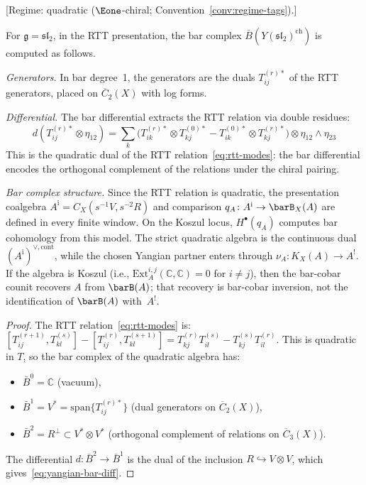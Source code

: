 \begin{theorem}\label{thm:yangian-bar-rtt}
\textup{[Regime: quadratic \textup{(}$\Eone$-chiral;
Convention~\textup{\ref{conv:regime-tags})}.]}

For $\mathfrak{g} = \mathfrak{sl}_2$, in the RTT presentation, the bar complex $\bar{B}(Y(\mathfrak{sl}_2)^{\mathrm{ch}})$ is computed as follows.

\emph{Generators.} In bar degree~1, the generators are the duals $T_{ij}^{(r)*}$ of the RTT generators, placed on $\overline{C}_2(X)$ with log forms.

\emph{Differential.} The bar differential extracts the RTT relation via double residues:
\begin{equation}\label{eq:yangian-bar-diff}
d(T_{ij}^{(r)*} \otimes \eta_{12}) = \sum_{k} \bigl(T_{ik}^{(r)*} \otimes T_{kj}^{(0)*} - T_{ik}^{(0)*} \otimes T_{kj}^{(r)*}\bigr) \otimes \eta_{12} \wedge \eta_{23}
\end{equation}
This is the quadratic dual of the RTT relation~\eqref{eq:rtt-modes}: the bar differential encodes the orthogonal complement of the relations under the chiral pairing.

\emph{Bar complex structure.} Since the RTT relation is quadratic,
the presentation coalgebra
$A^{\mathrm i}=C_X(s^{-1}V,s^{-2}R)$ and comparison
$q_A\colon A^{\mathrm i}\to\barB_X(A)$ are defined in every finite
window.  On the Koszul locus, $H^\bullet(q_A)$ computes bar cohomology
from this model. The strict quadratic algebra is the continuous dual
$(A^{\mathrm i})^{\vee,\mathrm{cont}}$, while the chosen Yangian
partner enters through $\nu_A\colon K_X(A)\to A^!$. If the algebra is Koszul
\textup{(}i.e.,
$\mathrm{Ext}^{i,j}_A(\mathbb{C}, \mathbb{C})=0$ for $i\neq j$\textup{)},
then the bar-cobar counit recovers $A$ from $\barB(A)$; that recovery is
bar-cobar inversion, not the identification of $\barB(A)$ with~$A^!$.
\end{theorem}

\begin{proof}
The RTT relation~\eqref{eq:rtt-modes} is:
$[T_{ij}^{(r+1)}, T_{kl}^{(s)}] - [T_{ij}^{(r)}, T_{kl}^{(s+1)}] = T_{kj}^{(r)} T_{il}^{(s)} - T_{kj}^{(s)} T_{il}^{(r)}$.
This is quadratic in $T$, so the bar complex of the quadratic algebra has:
\begin{itemize}
\item $\bar{B}^0 = \mathbb{C}$ (vacuum),
\item $\bar{B}^1 = V^* = \mathrm{span}\{T_{ij}^{(r)*}\}$ (dual generators on $\overline{C}_2(X)$),
\item $\bar{B}^2 = R^\perp \subset V^* \otimes V^*$ (orthogonal complement of relations on $\overline{C}_3(X)$).
\end{itemize}
The differential $d\colon \bar{B}^2 \to \bar{B}^1$ is the dual of the inclusion $R \hookrightarrow V \otimes V$, which gives~\eqref{eq:yangian-bar-diff}.
\end{proof}

